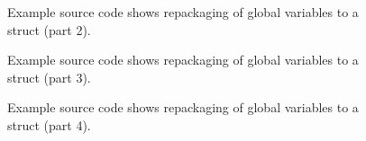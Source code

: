 \begin{figure}[!h]
{\indent
{\mySmallestFontSize


\begin{latexonly}
   
\end{latexonly}

\begin{htmlonly}
%   
\end{htmlonly}

}
}
\caption{Example source code shows repackaging of global variables to a struct (part 2).}
\label{Tutorial:exampleGlobalVariableHandling2}
\end{figure}

\begin{figure}[!h]
{\indent
{\mySmallestFontSize


\begin{latexonly}
   
\end{latexonly}

\begin{htmlonly}
%   
\end{htmlonly}

}
}
\caption{Example source code shows repackaging of global variables to a struct (part 3).}
\label{Tutorial:exampleGlobalVariableHandling3}
\end{figure}

\begin{figure}[!h]
{\indent
{\mySmallestFontSize


\begin{latexonly}
   
\end{latexonly}

\begin{htmlonly}
%   
\end{htmlonly}

}
}
\caption{Example source code shows repackaging of global variables to a struct (part 4).}
\label{Tutorial:exampleGlobalVariableHandling4}
\end{figure}

